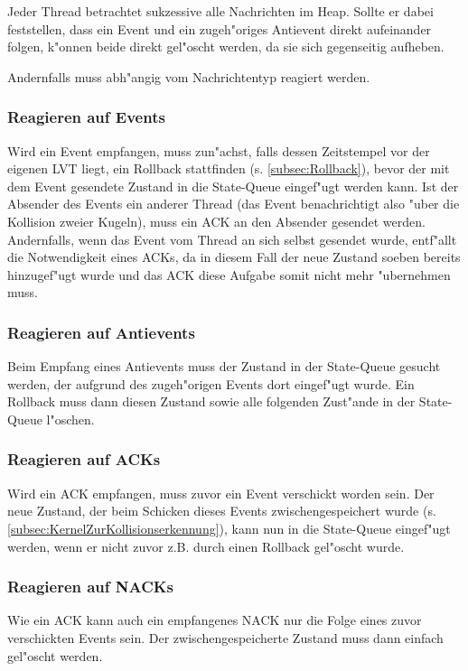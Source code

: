 \documentclass[a4paper, 10pt, openright, parskip, chapterprefix]{scrreprt}
\begin{document}
Jeder Thread betrachtet sukzessive alle Nachrichten im Heap. Sollte er dabei feststellen, dass ein Event und ein
zugeh"origes Antievent direkt aufeinander folgen, k"onnen beide direkt gel"oscht werden, da sie sich gegenseitig
aufheben.

Andernfalls muss abh"angig vom Nachrichtentyp reagiert werden.

\subsubsection{Reagieren auf Events}
Wird ein Event empfangen, muss zun"achst, falls dessen Zeitstempel vor der eigenen LVT liegt, 
ein Rollback stattfinden (s. \ref{subsec:Rollback}), bevor der mit dem Event gesendete
Zustand in die State-Queue eingef"ugt werden kann. Ist der Absender des Events ein anderer Thread (das Event
benachrichtigt also "uber die Kollision zweier Kugeln), muss ein ACK an den Absender gesendet werden. Andernfalls, wenn
das Event vom Thread an sich selbst gesendet wurde, entf"allt die Notwendigkeit eines ACKs, da in diesem Fall der neue Zustand soeben
bereits hinzugef"ugt wurde und das ACK diese Aufgabe somit nicht mehr "ubernehmen muss.

\subsubsection{Reagieren auf Antievents}
Beim Empfang eines Antievents muss der Zustand in der State-Queue gesucht werden, der aufgrund des zugeh"origen Events
dort eingef"ugt wurde. Ein Rollback muss dann diesen Zustand sowie alle folgenden Zust"ande in der State-Queue
l"oschen.

\subsubsection{Reagieren auf ACKs}
\label{subsubsed:ReagierenAufACKs}
Wird ein ACK empfangen, muss zuvor ein Event verschickt worden sein. Der neue Zustand, der beim Schicken dieses
Events zwischengespeichert wurde (s. \ref{subsec:KernelZurKollisionserkennung}), kann nun in die State-Queue eingef"ugt
werden, wenn er nicht zuvor z.B. durch einen Rollback gel"oscht wurde.

\subsubsection{Reagieren auf NACKs}
Wie ein ACK kann auch ein empfangenes NACK nur die Folge eines zuvor verschickten Events sein. Der zwischengespeicherte
Zustand muss dann einfach gel"oscht werden.
\end{document}
